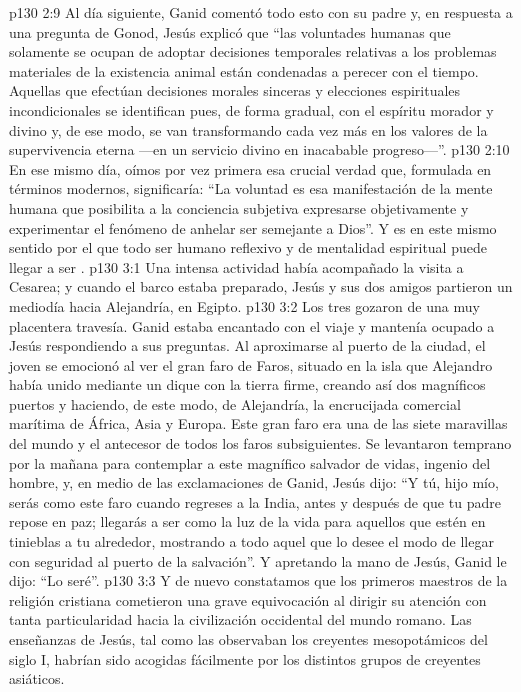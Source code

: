 \vs p130 2:9 \pc Al día siguiente, Ganid comentó todo esto con su padre y, en respuesta a una pregunta de Gonod, Jesús explicó que “las voluntades humanas que solamente se ocupan de adoptar decisiones temporales relativas a los problemas materiales de la existencia animal están condenadas a perecer con el tiempo. Aquellas que efectúan decisiones morales sinceras y elecciones espirituales incondicionales se identifican pues, de forma gradual, con el espíritu morador y divino y, de ese modo, se van transformando cada vez más en los valores de la supervivencia eterna ---en un servicio divino en inacabable progreso---”.
\vs p130 2:10 \pc En ese mismo día, oímos por vez primera esa crucial verdad que, formulada en términos modernos, significaría: “La voluntad es esa manifestación de la mente humana que posibilita a la conciencia subjetiva expresarse objetivamente y experimentar el fenómeno de anhelar ser semejante a Dios”. Y es en este mismo sentido por el que todo ser humano reflexivo y de mentalidad espiritual puede llegar a ser .
\vs p130 3:1 Una intensa actividad había acompañado la visita a Cesarea; y cuando el barco estaba preparado, Jesús y sus dos amigos partieron un mediodía hacia Alejandría, en Egipto.
\vs p130 3:2 Los tres gozaron de una muy placentera travesía. Ganid estaba encantado con el viaje y mantenía ocupado a Jesús respondiendo a sus preguntas. Al aproximarse al puerto de la ciudad, el joven se emocionó al ver el gran faro de Faros, situado en la isla que Alejandro había unido mediante un dique con la tierra firme, creando así dos magníficos puertos y haciendo, de este modo, de Alejandría, la encrucijada comercial marítima de África, Asia y Europa. Este gran faro era una de las siete maravillas del mundo y el antecesor de todos los faros subsiguientes. Se levantaron temprano por la mañana para contemplar a este magnífico salvador de vidas, ingenio del hombre, y, en medio de las exclamaciones de Ganid, Jesús dijo: “Y tú, hijo mío, serás como este faro cuando regreses a la India, antes y después de que tu padre repose en paz; llegarás a ser como la luz de la vida para aquellos que estén en tinieblas a tu alrededor, mostrando a todo aquel que lo desee el modo de llegar con seguridad al puerto de la salvación”. Y apretando la mano de Jesús, Ganid le dijo: “Lo seré”.
\vs p130 3:3 \pc Y de nuevo constatamos que los primeros maestros de la religión cristiana cometieron una grave equivocación al dirigir su atención con tanta particularidad hacia la civilización occidental del mundo romano. Las enseñanzas de Jesús, tal como las observaban los creyentes mesopotámicos del siglo I, habrían sido acogidas fácilmente por los distintos grupos de creyentes asiáticos.
